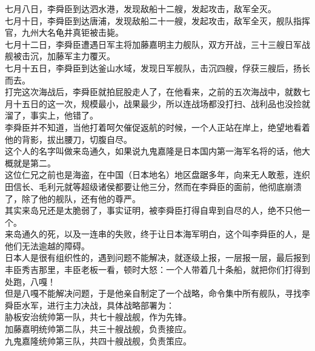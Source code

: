 \begin{multicols}{\theparacolNo}
七月八日，李舜臣到达泗水港，发现敌船十二艘，发起攻击，敌军全灭。\\

七月十日，李舜臣到达唐浦，发现敌船二十一艘，发起攻击，敌军全灭，舰队指挥官，九州大名龟井真钜被击毙。\\

七月十二日，李舜臣遭遇日军主将加藤嘉明主力舰队，双方开战，三十三艘日军战舰被击沉，加藤军主力覆灭。\\

七月十五日，李舜臣到达釜山水域，发现日军舰队，击沉四艘，俘获三艘后，扬长而去。\\

打完这次海战后，李舜臣就拍屁股走人了，在他看来，之前的五次海战中，就数七月十五日的这一次，规模最小，战果最少，所以连战场都没打扫、战利品也没捡就溜了，事实上，他错了。\\

李舜臣并不知道，当他打着呵欠催促返航的时候，一个人正站在岸上，绝望地看着他的背影，拔出腰刀，切腹自尽。\\

这个人的名字叫做来岛通久，如果说九鬼嘉隆是日本国内第一海军名将的话，他大概就是第二。\\

这位仁兄之前也是海盗，在中国（日本地名）地区盘踞多年，向来无人敢惹，连织田信长、毛利元就等超级诸侯都要让他三分，然而在李舜臣的面前，他彻底崩溃了，除了他的舰队，还有他的尊严。\\

其实来岛兄还是太脆弱了，事实证明，被李舜臣打得自卑到自尽的人，绝不只他一个。\\

来岛通久的死，以及一连串的失败，终于让日本海军明白，这个叫李舜臣的人，是他们无法逾越的障碍。\\

日本人是很有组织性的，遇到问题不能解决，就逐级上报，一层报一层，最后报到丰臣秀吉那里，丰臣老板一看，顿时大怒：一个人带着几十条船，就把你们打得到处跑，八嘎！\\

但是八嘎不能解决问题，于是他亲自制定了一个战略，命令集中所有舰队，寻找李舜臣水军，进行主力决战，具体战略部署为：\\

胁板安治统帅第一队，共七十艘战舰，作为先锋。\\

加藤嘉明统帅第二队，共三十艘战舰，负责接应。\\

九鬼嘉隆统帅第三队，共四十艘战舰，负责策应。\\


\end{multicols}
